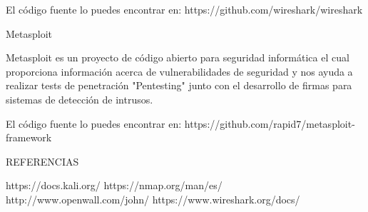 El código fuente lo puedes encontrar en: https://github.com/wireshark/wireshark

Metasploit

Metasploit es un proyecto de código abierto para seguridad informática el cual proporciona información acerca de vulnerabilidades de seguridad y nos ayuda a realizar tests de penetración "Pentesting" junto con el desarrollo de firmas para sistemas de detección de intrusos.

El código fuente lo puedes encontrar en:  https://github.com/rapid7/metasploit-framework

REFERENCIAS

https://docs.kali.org/
https://nmap.org/man/es/
http://www.openwall.com/john/
https://www.wireshark.org/docs/

